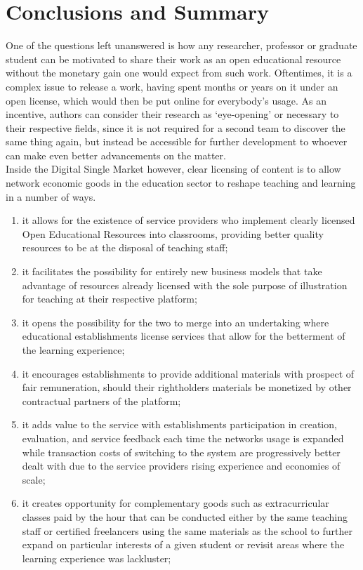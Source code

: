 \documentclass[a4paper]{article}
\begin{document}
\section{Conclusions and Summary} \label{sum}
One of the questions left unanswered is how any researcher, professor or graduate student can be motivated to share their work as an open educational resource without the monetary gain one would expect from such work. Oftentimes, it is a complex issue to release a work, having spent months or years on it under an open license, which would then be put online for everybody's usage. As an incentive, authors can consider their research as `eye-opening' or necessary to their respective fields, since it is not required for a second team to discover the same thing again, but instead be accessible for further development to whoever can make even better advancements on the matter. \\

\noindent
Inside the Digital Single Market however, clear licensing of content is to allow network economic goods in the education sector to reshape teaching and learning in a number of ways.
\begin{enumerate}
\item it allows for the existence of service providers who implement clearly licensed Open Educational Resources into classrooms, providing better quality resources to be at the disposal of teaching staff;
\item it facilitates the possibility for entirely new business models that take advantage of resources already licensed with the sole purpose of illustration for teaching at their respective platform;
\item it opens the possibility for the two to merge into an undertaking where educational establishments license services that allow for the betterment of the learning experience;
\item it encourages establishments to provide additional materials with prospect of fair remuneration, should their rightholders materials be monetized by other contractual partners of the platform;
\item it adds value to the service with establishments participation in creation, evaluation, and service feedback each time the networks usage is expanded while transaction costs of switching to the system are progressively better dealt with due to the service providers rising experience and economies of scale;
\item it creates opportunity for complementary goods such as extracurricular classes paid by the hour that can be conducted either by the same teaching staff or certified freelancers using the same materials as the school to further expand on particular interests of a given student or revisit areas where the learning experience was lackluster;
\end{enumerate}
\end{document}
